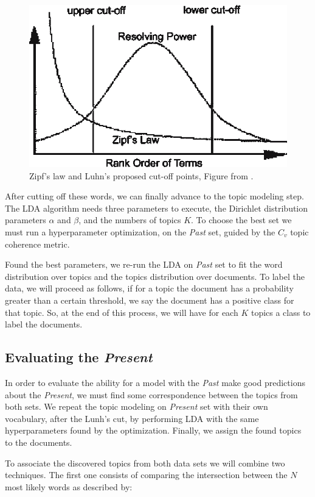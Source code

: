\begin{figure}[h!]
	\centering
	\includegraphics[width=0.55\linewidth]{01.Chapters/04.Materials/Zipfs-law-and-Luhns-proposed-cut-off-points}
	\caption{Zipf’s law and Luhn’s proposed cut-off points, Figure from \cite{cummins2006evolving}.}
	\label{fig:zipfs-law-and-luhns-proposed-cut-off-points}
\end{figure}

After cutting off these words, we can finally advance to the topic modeling step. The LDA algorithm needs three parameters to execute, the Dirichlet distribution parameters $\alpha$ and $\beta$, and the numbers of topics $K$. To choose the best set we must run a hyperparameter optimization, on the \textit{Past} set, guided by the $C_{v}$ topic coherence metric.

Found the best parameters, we re-run the LDA on \textit{Past} set to fit the word distribution over topics and the topics distribution over documents. To label the data, we will proceed as follows, if for a topic the document has a probability greater than a certain threshold, we say the document has a positive class for that topic. So, at the end of this process, we will have for each $K$ topics a class to label the documents.

\subsection{Evaluating the \textit{Present}}\label{sec:material-combination}

In order to evaluate the ability for a model with the \textit{Past} make good predictions about the \textit{Present}, we must find some correspondence between the topics from both sets. We repeat the topic modeling on \textit{Present} set with their own vocabulary, after the Lunh's cut, by performing LDA with the same hyperparameters found by the optimization. Finally, we assign the found topics to the documents.

To associate the discovered topics from both data sets we will combine two techniques. The first one consists of comparing the intersection between the $N$ most likely words as described by:

